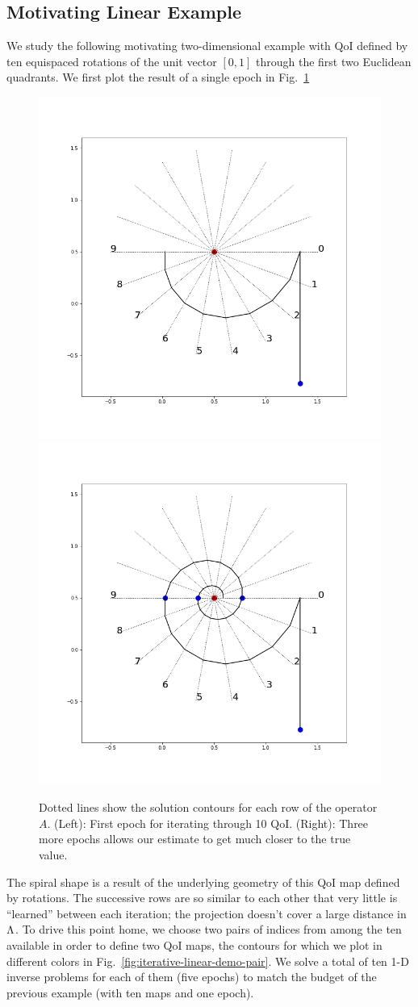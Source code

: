 \subsection{Motivating Linear Example}
We study the following motivating two-dimensional example with QoI defined by ten equispaced rotations of the unit vector $[0, 1]$ through the first two Euclidean quadrants.
We first plot the result of a single epoch in Fig.~\ref{fig:iterative-linear-demo}
\begin{figure}
  \centering
  \includegraphics[width=0.475\linewidth]{examples/iterative/10D-firstepoch}
  \includegraphics[width=0.475\linewidth]{examples/iterative/10D-fewepochs}

  \caption{
  Dotted lines show the solution contours for each row of the operator $A$.
  (Left): First epoch for iterating through 10 QoI.
  (Right): Three more epochs allows our estimate to get much closer to the true value.
  }
  \label{fig:iterative-linear-demo}
\end{figure}

The spiral shape is a result of the underlying geometry of this QoI map defined by rotations. The successive rows are so similar to each other that very little is ``learned'' between each iteration; the projection doesn't cover a large distance in ${\Lambda}$.
To drive this point home, we choose two pairs of indices from among the ten available in order to define two QoI maps, the contours for which we plot in different colors in Fig.~\ref{fig:iterative-linear-demo-pair}.
We solve a total of ten 1-D inverse problems for each of them (five epochs) to match the budget of the previous example (with ten maps and one epoch).

